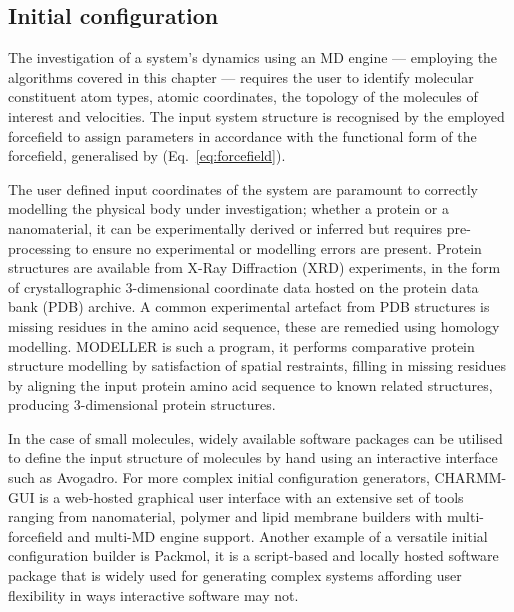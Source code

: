 \subsection{Initial configuration} 
%
The investigation of a system's dynamics using an MD engine --- employing the algorithms covered in this chapter --- requires the user to identify molecular constituent atom types, atomic coordinates, the topology of the molecules of interest and velocities.  The input system structure is recognised by the employed forcefield to assign parameters in accordance with the functional form of the forcefield, generalised by (Eq.~\ref{eq:forcefield}). 

The user defined input coordinates of the system are paramount to correctly modelling the physical body under investigation; whether a protein or a nanomaterial, it can be experimentally derived or inferred but requires pre-processing to ensure no experimental or modelling errors are present. Protein structures are available from X-Ray Diffraction (XRD) experiments, in the form of crystallographic 3-dimensional coordinate data hosted on the protein data bank (PDB) archive.\cite{PDB} A common experimental artefact from PDB structures is missing residues in the amino acid sequence, these are remedied using homology modelling. MODELLER is such a program, it performs comparative protein structure modelling by satisfaction of spatial restraints, filling in missing residues by aligning the input protein amino acid sequence to known related structures, producing 3-dimensional protein structures.\cite{marti2000comparative, webb2016comparative} 

In the case of small molecules, widely available software packages can be utilised to define the input structure of molecules by hand using an interactive interface such as Avogadro.\cite{hanwell2012avogadro} For more complex initial configuration generators, CHARMM-GUI is a web-hosted graphical user interface with an extensive set of tools ranging from nanomaterial, polymer and lipid membrane builders with multi-forcefield and multi-MD engine support.\cite{jo2008charmm} Another example of a versatile initial configuration builder is Packmol, it is a script-based and locally hosted software package that is widely used for generating complex systems affording user flexibility in ways interactive software may not.\cite{martinez2009packmol}

